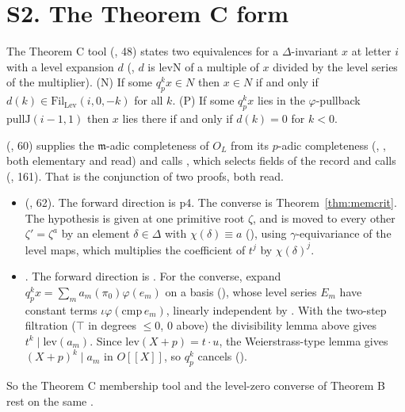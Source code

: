 \documentclass[11pt]{article}
\newcommand{\Fil}{\mathrm{Fil}}
\theoremstyle{definition}
\theoremstyle{remark}
\begin{document}
\section{S2. The Theorem C form}\label{sec:expcrit}

The Theorem C tool  (, 48) states two equivalences for a $\Delta$-invariant $x$ at letter $i$ with a level expansion $d$ (, $d$ is $\mathrm{levN}$ of a multiple of $x$ divided by the level series of the multiplier). (N) If some $q_p^kx\in N$ then $x\in N$ if and only if $d(k)\in\Fil_{\mathrm{Lev}}(i,0,-k)$ for all $k$. (P) If some $q_p^kx$ lies in the $\varphi$-pullback $\mathrm{pullJ}(i-1,1)$ then $x$ lies there if and only if $d(k)=0$ for $k<0$.

 (, 60) supplies the $\mathfrak m$-adic completeness of $O_L$ from its $p$-adic completeness (, , both elementary and read) and calls , which selects fields of the record  and calls  (, 161). That is the conjunction of two proofs, both read.
\begin{itemize}[leftmargin=*,itemsep=1pt]
\item {} (, 62). The forward direction is p4. The converse is Theorem~\ref{thm:memcrit}. The hypothesis is given at one primitive root $\zeta$, and is moved to every other $\zeta'=\zeta^a$ by an element $\delta\in\Delta$ with $\chi(\delta)\equiv a$ (), using $\gamma$-equivariance of the level maps, which multiplies the coefficient of $t^j$ by $\chi(\delta)^j$.
\item {}. The forward direction is . For the converse, expand $q_p^kx=\sum_ma_m(\pi_0)\varphi(e_m)$ on a basis (), whose level series $E_m$ have constant terms $\iota\varphi(\mathrm{cmp}\,e_m)$, linearly independent by . With the two-step filtration ($\top$ in degrees $\le0$, $0$ above) the divisibility lemma above gives $t^k\mid\mathrm{lev}(a_m)$. Since $\mathrm{lev}(X+p)=t\cdot u$, the Weierstrass-type lemma  gives $(X+p)^k\mid a_m$ in $O[[X]]$, so $q_p^k$ cancels ().
\end{itemize}

So the Theorem C membership tool and the level-zero converse of Theorem B rest on the same .
\end{document}
